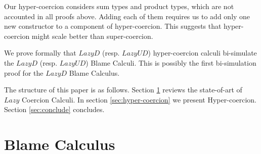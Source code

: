 \documentclass[acmsmall,review,anonymous]{acmart}\settopmatter{printfolios=true,printccs=false,printacmref=false}
\begin{document}
Our hyper-coercion considers sum types and product types, which are not 
accounted in all proofs above. Adding each of them requires us to add only one 
new constructor to a component of hyper-coercion. This suggests that 
hyper-coercion might scale better than super-coercion.

We prove formally that $ Lazy D $ (resp. $ Lazy UD $) hyper-coercion calculi 
bi-simulate the $ Lazy D $ (resp. $ Lazy UD $) Blame Calculi. This is possibly 
the first bi-simulation proof for the $ Lazy D $ Blame Calculus.

The structure of this paper is as follows. Section \ref{sec:blame-calculus} 
reviews the state-of-art of $Lazy$ Coercion Calculi. In section 
\ref{sec:hyper-coercion} we present Hyper-coercion. Section \ref{sec:conclude} 
concludes.

\section{Blame Calculus} \label{sec:blame-calculus}
\end{document}
